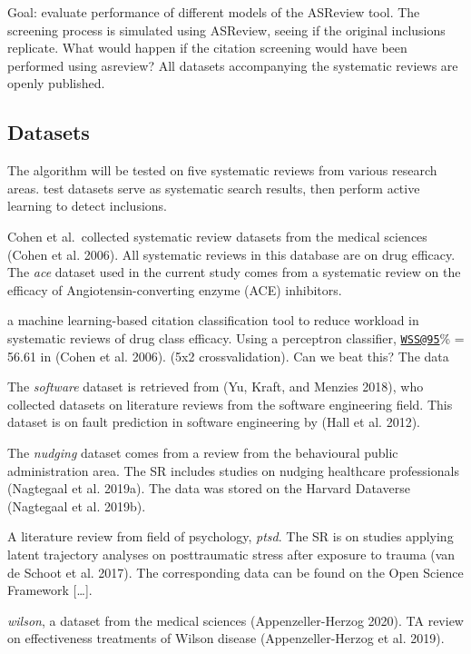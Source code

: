 \documentclass[
]{article}
\begin{document}
Goal: evaluate performance of different models of the ASReview tool. The
screening process is simulated using ASReview, seeing if the original
inclusions replicate. What would happen if the citation screening would
have been performed using asreview? All datasets accompanying the
systematic reviews are openly published.

\hypertarget{datasets}{%
\subsection{Datasets}\label{datasets}}

The algorithm will be tested on five systematic reviews from various
research areas. test datasets serve as systematic search results, then
perform active learning to detect inclusions.

Cohen et al.~collected systematic review datasets from the medical
sciences (Cohen et al. 2006). All systematic reviews in this database
are on drug efficacy. The \emph{ace} dataset used in the current study
comes from a systematic review on the efficacy of Angiotensin-converting
enzyme (ACE) inhibitors.

a machine learning-based citation classification tool to reduce workload
in systematic reviews of drug class efficacy. Using a perceptron
classifier, \href{mailto:WSS@95}{\nolinkurl{WSS@95}}\% = 56.61 in (Cohen
et al. 2006). (5x2 crossvalidation). Can we beat this? The data

The \emph{software} dataset is retrieved from (Yu, Kraft, and Menzies
2018), who collected datasets on literature reviews from the software
engineering field. This dataset is on fault prediction in software
engineering by (Hall et al. 2012).

The \emph{nudging} dataset comes from a review from the behavioural
public administration area. The SR includes studies on nudging
healthcare professionals (Nagtegaal et al. 2019a). The data was stored
on the Harvard Dataverse (Nagtegaal et al. 2019b).

A literature review from field of psychology, \emph{ptsd}. The SR is on
studies applying latent trajectory analyses on posttraumatic stress
after exposure to trauma (van de Schoot et al. 2017).
The corresponding data can be found on the Open Science Framework
{[}\ldots{]}.

\emph{wilson}, a dataset from the medical sciences (Appenzeller-Herzog
2020). TA review on effectiveness treatments of Wilson disease
(Appenzeller-Herzog et al. 2019).
\end{document}
